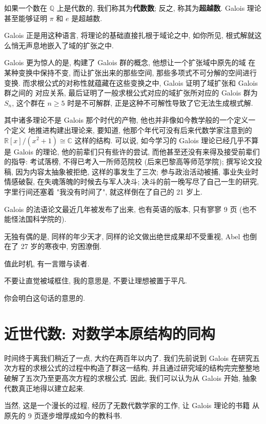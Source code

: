 \documentclass[UTF8]{book}
\begin{document}
如果一个数在 $\mathbb{Q}$ 上是代数的, 我们称其为\textbf{代数数}; 
反之, 称其为\textbf{超越数}. 
Galois 理论甚至能够证明 $\pi$ 和 $e$ 是超越数. 

Galois 正是用这种语言, 将理论的基础直接扎根于域论之中, 如你所见, 
根式解就这么悄无声息地嵌入了域的扩张之中. 

Galois 更为惊人的是, 构建了 Galois 群的概念, 他想让一个扩张域中原先的域
在某种变换中保持不变, 而让扩张出来的那些空间, 那些多项式不可分解的空间进行变换. 
而求根公式的对称性就蕴藏在这些变换之中, Galois 证明了域扩张和 Galois 群之间的
对应关系, 最后证明了一般求根公式对应的域扩张所对应的 Galois 群为 $S_n$, 
这个群在 $n\geq 5$ 时是不可解群, 正是这种不可解性导致了它无法生成根式解.

其中诸多理论不是 Galois 那个时代的产物, 他也并非像如今教学般的一个定义一个定义
地推进构建出理论来, 要知道, 他那个年代可没有后来代数学家注意到的 
$ \mathbb{R}[x]/(x^2+1) \cong \mathbb{C} $ 这样的结构. 
可以说, 
如今学习的 Galois 理论已经几乎不算是 Galois 的理论, 
他的前辈们只有些许的尝试, 而他甚至还没有来得及接受前辈们的指导:  
考试落榜, 不得已考入一所师范院校 (后来巴黎高等师范学院); 撰写论文投稿, 
因为内容太抽象被拒绝, 这样的事发生了三次; 参与政治活动被捕, 事业失业时
情感破裂, 在失魂落魄的时候去与军人决斗; 
决斗的前一晚写尽了自己一生的研究, 字里行间还塞着 "我没有时间了", 
就这样倒在了自己的 21 岁上. 

Galois 的法语论文最近几年被发布了出来, 也有英语的版本, 只有寥寥 9 页 
(也不能怪法国科学院的). 

无独有偶的是, 同样的年少天才, 同样的论文做出绝世成果却不受重视, Abel 也倒在了
27 岁的寒夜中, 穷困潦倒. 

值此时机, 有一言赠与读者. 

不要让直觉被域框住, 我的意思是, 不要让理想被置于平凡. 

你会明白这句话的意思的. 

\section{近世代数: 对数学本原结构的同构}
时间终于离我们稍近了一点, 大约在两百年以内了. 
我们先前说到 Galois 在研究五次方程的求根公式的过程中构造了群这一结构, 
并且通过研究域的结构完完整整地破解了五次乃至更高次方程的求根公式. 
因此, 我们可以认为从 Galois 开始, 抽象代数真正地得以建立起来. 

当然, 这是一个漫长的过程, 经历了无数代数学家的工作, 让 Galois 理论的书籍
从原先的 9 页逐步增厚成如今的教科书. 
\end{document}
